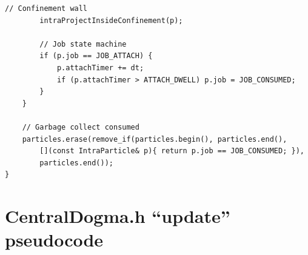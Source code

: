 \documentclass[11pt,letterpaper,twoside,openany]{book}
\begin{document}
\begin{lstlisting}[language={[ISO]C++}]
        // Confinement wall
        intraProjectInsideConfinement(p);

        // Job state machine
        if (p.job == JOB_ATTACH) {
            p.attachTimer += dt;
            if (p.attachTimer > ATTACH_DWELL) p.job = JOB_CONSUMED;
        }
    }

    // Garbage collect consumed
    particles.erase(remove_if(particles.begin(), particles.end(),
        [](const IntraParticle& p){ return p.job == JOB_CONSUMED; }),
        particles.end());
}
\end{lstlisting}

\chapter{CentralDogma.h ``update'' pseudocode}
\label{ch:cdogma-pseudo}
\end{document}
